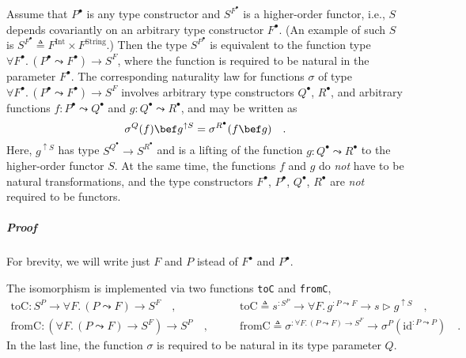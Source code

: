 Assume that $P^{\bullet}$ is any type constructor and $S^{F^{\bullet}}$
is a higher-order functor,
i.e., $S$ depends covariantly on an arbitrary type constructor $F^{\bullet}$.
(An example of such $S$ is $S^{F^{\bullet}}\triangleq F^{\text{Int}}\times F^{\text{String}}$.)
Then the type $S^{P^{\bullet}}$ is equivalent to the function type
$\forall F^{\bullet}.\,(P^{\bullet}\leadsto F^{\bullet})\rightarrow S^{F}$,
where the function is required to be natural in the parameter $F^{\bullet}$.
The corresponding naturality law for functions $\sigma$ of type $\forall F^{\bullet}.\,(P^{\bullet}\leadsto F^{\bullet})\rightarrow S^{F}$
involves arbitrary type constructors $Q^{\bullet}$, $R^{\bullet}$,
and arbitrary functions $f:P^{\bullet}\leadsto Q^{\bullet}$ and $g:Q^{\bullet}\leadsto R^{\bullet}$,
and may be written as
\begin{equation}
\sigma^{Q}(f)\bef g^{\uparrow S}=\sigma^{R^{\bullet}}(f\bef g)\quad.\label{eq:assumed-naturality-of-argument-sigma}
\end{equation}
Here, $g^{\uparrow S}$ has type $S^{Q^{\bullet}}\rightarrow S^{R^{\bullet}}$
and is a lifting of the function $g:Q^{\bullet}\leadsto R^{\bullet}$
to the higher-order functor $S$. At the same time, the functions
$f$ and $g$ do \emph{not} have to be natural transformations, and
the type constructors $F^{\bullet}$, $P^{\bullet}$, $Q^{\bullet}$,
$R^{\bullet}$ are \emph{not} required to be functors.

\subparagraph{Proof}

For brevity, we will write just $F$ and $P$ istead of $F^{\bullet}$
and $P^{\bullet}$.

The isomorphism is implemented via two functions \lstinline!toC!
and \lstinline!fromC!,
\begin{align*}
\text{toC}:S^{P}\rightarrow\forall F.\,(P\leadsto F)\rightarrow S^{F}\quad, & \quad\quad\text{toC}\triangleq s^{:S^{P}}\rightarrow\forall F.\,g^{:P\leadsto F}\rightarrow s\triangleright g^{\uparrow S}\quad,\\
\text{fromC}:(\forall F.\,(P\leadsto F)\rightarrow S^{F})\rightarrow S^{P}\quad, & \quad\quad\text{fromC}\triangleq\sigma^{:\forall F.\,(P\leadsto F)\rightarrow S^{F}}\rightarrow\sigma^{P}(\text{id}^{:P\leadsto P})\quad.
\end{align*}
In the last line, the function $\sigma$ is required to be natural
in its type parameter $Q$.

